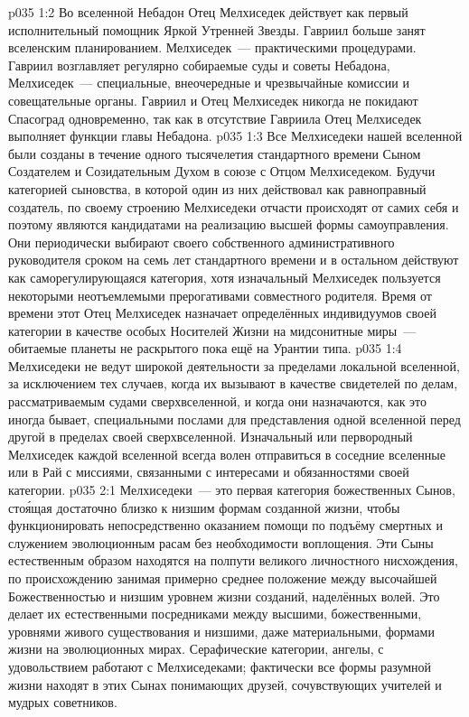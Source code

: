 \vs p035 1:2 Во вселенной Небадон Отец Мелхиседек действует как первый исполнительный помощник Яркой Утренней Звезды. Гавриил больше занят вселенским планированием. Мелхиседек~--- практическими процедурами. Гавриил возглавляет регулярно собираемые суды и советы Небадона, Мелхиседек~--- специальные, внеочередные и чрезвычайные комиссии и совещательные органы. Гавриил и Отец Мелхиседек никогда не покидают Спасоград одновременно, так как в отсутствие Гавриила Отец Мелхиседек выполняет функции главы Небадона.
\vs p035 1:3 Все Мелхиседеки нашей вселенной были созданы в течение одного тысячелетия стандартного времени Сыном Создателем и Созидательным Духом в союзе с Отцом Мелхиседеком. Будучи категорией сыновства, в которой один из них действовал как равноправный создатель, по своему строению Мелхиседеки отчасти происходят от самих себя и поэтому являются кандидатами на реализацию высшей формы самоуправления. Они периодически выбирают своего собственного административного руководителя сроком на семь лет стандартного времени и в остальном действуют как саморегулирующаяся категория, хотя изначальный Мелхиседек пользуется некоторыми неотъемлемыми прерогативами совместного родителя. Время от времени этот Отец Мелхиседек назначает определённых индивидуумов своей категории в качестве особых Носителей Жизни на мидсонитные миры~--- обитаемые планеты не раскрытого пока ещё на Урантии типа.
\vs p035 1:4 Мелхиседеки не ведут широкой деятельности за пределами локальной вселенной, за исключением тех случаев, когда их вызывают в качестве свидетелей по делам, рассматриваемым судами сверхвселенной, и когда они назначаются, как это иногда бывает, специальными послами для представления одной вселенной перед другой в пределах своей сверхвселенной. Изначальный или первородный Мелхиседек каждой вселенной всегда волен отправиться в соседние вселенные или в Рай с миссиями, связанными с интересами и обязанностями своей категории.
\vs p035 2:1 Мелхиседеки~--- это первая категория божественных Сынов, сто\'ящая достаточно близко к низшим формам созданной жизни, чтобы функционировать непосредственно оказанием помощи по подъёму смертных и служением эволюционным расам без необходимости воплощения. Эти Сыны естественным образом находятся на полпути великого личностного нисхождения, по происхождению занимая примерно среднее положение между высочайшей Божественностью и низшим уровнем жизни созданий, наделённых волей. Это делает их естественными посредниками между высшими, божественными, уровнями живого существования и низшими, даже материальными, формами жизни на эволюционных мирах. Серафические категории, ангелы, с удовольствием работают с Мелхиседеками; фактически все формы разумной жизни находят в этих Сынах понимающих друзей, сочувствующих учителей и мудрых советников.
